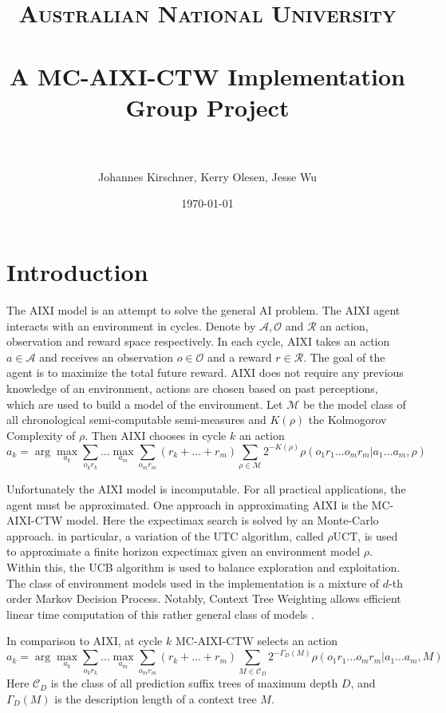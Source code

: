 \documentclass[paper=a4, fontsize=11pt]{scrartcl} %
\title{	
\normalfont \normalsize 
\textsc{Australian National University} \\ [25pt] %
\horrule{0.5pt} \\[0.4cm] %
\huge A MC-AIXI-CTW Implementation\\ Group Project \\ %
\horrule{2pt} \\[0.5cm] %
}
\author{Johannes Kirschner, Kerry Olesen, Jesse Wu} %
\date{\normalsize\today} %
\numberwithin{equation}{section} %
\numberwithin{figure}{section} %
\numberwithin{table}{section} %
\begin{document}
\maketitle %

\section{Introduction}
The AIXI model \cite{Hutter:04uaibook} is an attempt to solve the general AI problem. The AIXI agent interacts with an environment in cycles. Denote by $\mathcal{A}, \mathcal{O}$ and $\mathcal{R}$ an action, observation and reward space respectively. In each cycle, AIXI takes an action $a \in \mathcal{A}$ and receives an observation $o \in \mathcal{O}$ and a reward $r \in \mathcal{R}$. The goal of the agent is to maximize the total future reward. AIXI does not require any previous knowledge of an environment, actions are chosen based on past perceptions, which are used to build a model of the environment. Let $\mathcal{M}$ be the model class of all chronological semi-computable semi-measures and $K(\rho)$ the Kolmogorov Complexity of $\rho$. Then AIXI chooses in cycle $k$ an action
\[ a_k = \arg \max_{a_k} \sum_{o_kr_k} \dots \max_{a_m} \sum_{o_m r_m} (r_k + \dots + r_m) \sum_{\rho \in \mathcal{M}}2^{-K(\rho)} \rho(o_1r_1\dots o_m r_m|a_1\dots a_m, \rho) \]


\bigskip

Unfortunately the AIXI model is incomputable. For all practical applications, the agent must be approximated. One approach in approximating AIXI is the MC-AIXI-CTW \cite{VNHS09} model. Here the expectimax search is solved by an Monte-Carlo approach. in particular, a variation of the UTC \cite{UCT} algorithm, called $\rho$UCT, is used to approximate a finite horizon expectimax given an environment model $\rho$. Within this, the UCB \cite{Auer02} algorithm is used to balance exploration and exploitation. The class of environment models used in the implementation is a mixture of $d$-th order Markov Decision Process. Notably, Context Tree Weighting allows efficient linear time computation of this rather general class of models \cite{CTW}.

\bigskip

In comparison to AIXI, at cycle $k$ MC-AIXI-CTW selects an action
\[ a_k = \arg \max_{a_k} \sum_{o_kr_k} \dots \max_{a_m} \sum_{o_m r_m} (r_k + \dots + r_m) \sum_{M \in \mathcal{C}_D}2^{-\Gamma_D(M)} \rho(o_1r_1\dots o_m r_m|a_1\dots a_m, M) \]
Here $\mathcal{C}_D$ is the class of all prediction suffix trees of maximum depth $D$, and $\Gamma_D(M)$ is the description length of a context tree $M$.
\end{document}
